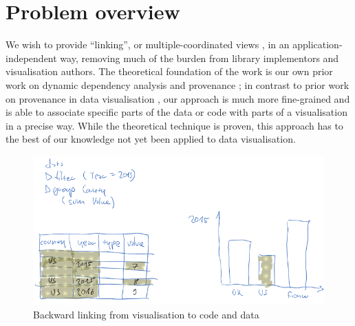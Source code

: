 \section{Problem overview}
\label{sec:problem-overview}

We wish to provide ``linking'', or multiple-coordinated views \cite{tobiasz09},
in an application-independent way, removing much of the burden from library
implementors and visualisation authors. The theoretical foundation of the work
is our own prior work on dynamic dependency analysis and provenance
\cite{perera16d, ricciotti17}; in contrast to prior work on provenance in data
visualisation \cite{callahan06}, our approach is much more fine-grained and is
able to associate specific parts of the data or code with parts of a
visualisation in a precise way. While the theoretical technique is proven, this
approach has to the best of our knowledge not yet been applied to data
visualisation.

\begin{figure}[h]
\includegraphics[scale=0.35]{image/chart-bwd}
\caption{Backward linking from visualisation to code and data}
\end{figure}

